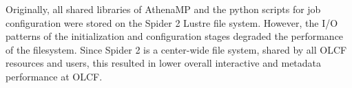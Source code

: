 



Originally, all shared libraries of AthenaMP and the python scripts for job
configuration were stored on the Spider 2 Lustre file system. However, the I/O
patterns of the initialization and configuration stages degraded the performance
of the filesystem. Since Spider 2 is a center-wide file system, shared by all
OLCF resources and users, this resulted in lower overall interactive and
metadata performance at OLCF\@. 

